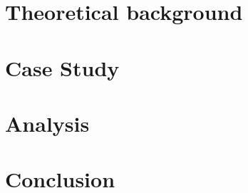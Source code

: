 \documentclass[oneside,12pt,bibliography=totoc]{scrbook}
\begin{document}
\chapter{Theoretical background}
\label{c:background}


\chapter{Case Study}
\label{c:casestudy}


\chapter{Analysis}
\label{c:analysis}


\chapter{Conclusion}
\label{c:conclusion}

    

\backmatter
        
\printbibliography[title={References}]

\appendix


% 
\end{document}
